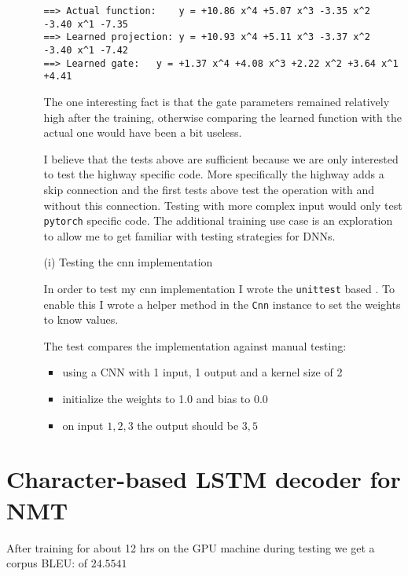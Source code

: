 \documentclass{article}
\begin{document}
\begin{enumerate}
\begin{itemize}
\begin{verbatim}
==> Actual function:	y = +10.86 x^4 +5.07 x^3 -3.35 x^2 -3.40 x^1 -7.35
==> Learned projection:	y = +10.93 x^4 +5.11 x^3 -3.37 x^2 -3.40 x^1 -7.42
==> Learned gate:	y = +1.37 x^4 +4.08 x^3 +2.22 x^2 +3.64 x^1 +4.41
\end{verbatim}

The one interesting fact is that the gate parameters remained relatively high after the training, otherwise comparing the learned function with the actual one would have been a bit useless.

I believe that the tests above are sufficient because we are only interested to test the highway specific code. More specifically the highway adds a skip connection and the first tests above test the operation with and without this connection. Testing with more complex input would only test \texttt{pytorch} specific code. The additional training use case is an exploration to allow me to get familiar with testing strategies for DNNs.

\clearpage

\item[(i)]{Testing the cnn implementation}

In order to test my cnn implementation I wrote the \texttt{unittest} based . To enable this I wrote a helper method in the \texttt{Cnn} instance to set the weights to know values.

The test compares the implementation against manual testing: 

\begin{itemize}

\item using a CNN with 1 input, 1 output and a kernel size of 2
\item initialize the weights to 1.0 and bias to 0.0
\item on input $1, 2, 3$ the output should be $3,5$
\end{itemize}

\end{itemize}


\end{enumerate}

\clearpage


\section{Character-based LSTM decoder for NMT}

After training for about 12 hrs on the GPU machine during testing we get a corpus BLEU: of $24.5541$
\end{document}
